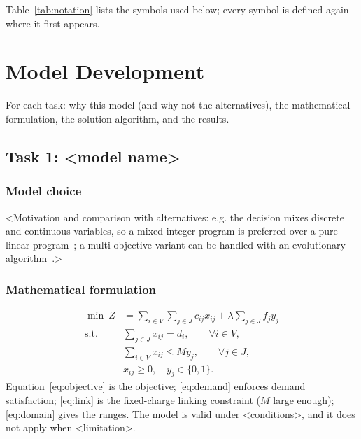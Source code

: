 \documentclass[12pt]{article}
\begin{document}
Table~\ref{tab:notation} lists the symbols used below; every symbol is defined
again where it first appears.

\section{Model Development}
For each task: why this model (and why not the alternatives), the
mathematical formulation, the solution algorithm, and the results.

\subsection{Task 1: <model name>}

\subsubsection{Model choice}
<Motivation and comparison with alternatives: e.g. the decision mixes
discrete and continuous variables, so a mixed-integer program is preferred
over a pure linear program~\cite{boyd2004convex}; a multi-objective variant
can be handled with an evolutionary algorithm~\cite{deb2002nsga2}.>

\subsubsection{Mathematical formulation}
\begin{align}
  \min\ Z & = \sum_{i \in V}\sum_{j \in J} c_{ij} x_{ij}
             + \lambda \sum_{j \in J} f_j y_j \label{eq:objective} \\[2pt]
  \text{s.t.}\quad
  & \sum_{j \in J} x_{ij} = d_i, \qquad \forall i \in V, \label{eq:demand} \\[2pt]
  & \sum_{i \in V} x_{ij} \le M y_j, \qquad \forall j \in J, \label{eq:link} \\[2pt]
  & x_{ij} \ge 0,\quad y_j \in \{0,1\}. \label{eq:domain}
\end{align}
Equation~\eqref{eq:objective} is the objective; \eqref{eq:demand} enforces
demand satisfaction; \eqref{eq:link} is the fixed-charge linking constraint
($M$ large enough); \eqref{eq:domain} gives the ranges. The model is valid
under <conditions>, and it does not apply when <limitation>.
\end{document}
